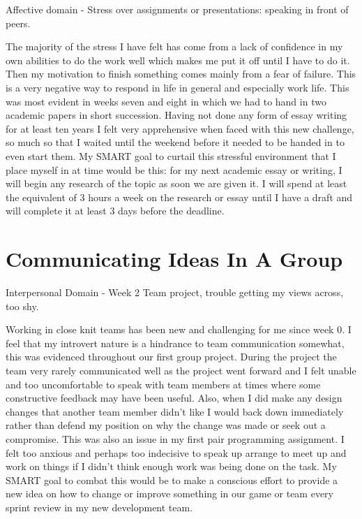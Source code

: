 \documentclass{scrartcl}
\begin{document}
Affective domain - Stress over assignments or presentations: speaking in front of peers.

The majority of the stress I have felt has come from a lack of confidence in my own abilities to do the work well which makes me put it off until I have to do it. Then my motivation to finish something comes mainly from a fear of failure. This is a very negative way to respond in life in general and especially work life. This was most evident in weeks seven and eight in which we had to hand in two academic papers in short succession. Having not done any form of essay writing for at least ten years I felt very apprehensive when faced with this new challenge, so much so that I waited until the weekend before it needed to be handed in to even start them. 
My SMART goal to curtail this stressful environment that I place myself in at time would be this: for my next academic essay or writing, I will begin any research of the topic as soon we are given it. I will spend at least the equivalent of 3 hours a week on the research or essay until I have a draft and will complete it at least 3 days before the deadline.

\section{Communicating Ideas In A Group}

Interpersonal Domain - Week 2 Team project, trouble getting my views across, too shy.

Working in close knit teams has been new and challenging for me since week 0. I feel that my introvert nature is a hindrance to team communication somewhat, this was evidenced throughout our first group project. During the project the team very rarely communicated well as the project went forward and I felt unable and too uncomfortable to speak with team members at times where some constructive feedback may have been useful. Also, when I did make any design changes that another team member didn't like I would back down immediately rather than defend my position on why the change was made or seek out a compromise. This was also an issue in my first pair programming assignment. I felt too anxious and perhaps too indecisive to speak up arrange to meet up and work on things if I didn't think enough work was being done on the task. My SMART goal to combat this would be to make a conscious effort to provide a new idea on how to change or improve something in our game or team every sprint review in my new development team.
\end{document}
